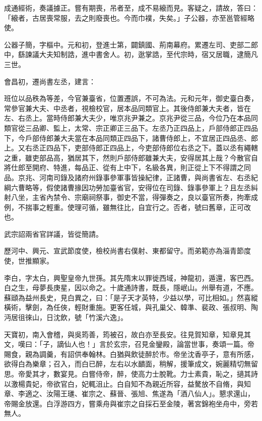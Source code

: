 \begin{pinyinscope}
 成通經術，奏議據正。嘗有期喪，吊者至，成不易縗而見。客疑之，請故，答曰：「縗者，古居喪常服，去之則廢喪也。今而巾襆，失矣。」子公器，亦至邕管經略使。



 公器子簡，字樞中。元和初，登進士第，闢鎮國、荊南幕府。累遷左司、吏部二郎中，繇諫議大夫知制誥，進中書舍人。初，逖掌誥，至代宗時，宿又居職，逮簡凡三世。



 會昌初，遷尚書左丞，建言：



 班位以品秩為等差，今官兼臺省，位置遷誤，不可為法。元和元年，御史臺白奏，常參官兼大夫、中丞者，視檢校官，居本品同類官上。其後侍郎兼大夫者，皆在左、右丞上。當時侍郎兼大夫少，唯京兆尹兼之。京兆尹從三品，今位乃在本品同類官從三品卿、監上，太常、宗正卿正三品下。左丞乃正四品上，戶部侍郎正四品下，今戶部侍郎兼大夫當在本品同類正四品下，諸曹侍郎上，不宜居正四品丞、郎上。又右丞正四品下，吏部侍郎正四品上，今吏部侍郎位右丞之下。蓋以丞有繩轄之重，雖吏部品高，猶居其下，然則戶部侍郎雖兼大夫，安得居其上哉？今散官自將仕郎至開府、特進，每品正、從有上中下，名級各異，則正從上下不得謂之同品。京兆、河南司錄及諸府州錄事參軍事皆操紀律，正諸曹，與尚書省左、右丞紀綱六曹略等，假使諸曹掾因功勞加臺省官，安得位在司錄、錄事參軍上？且左丞糾射八坐，主省內禁令、宗廟祠祭事，御史不當，得彈奏之，良以臺官所奏，拘牽成例，不揣事之輕重。使理可循，雖無往比，自宜行之。否者，號曰舊章，正可改也。



 武宗詔兩省官詳議，皆從簡請。



 歷河中、興元、宣武節度使，檢校尚書右僕射、東都留守。而弟範亦為淄青節度使，世推顯家。



 李白，字太白，興聖皇帝九世孫。其先隋末以罪徙西域，神龍初，遁還，客巴西。白之生，母夢長庚星，因以命之。十歲通詩書，既長，隱岷山。州舉有道，不應。蘇頲為益州長史，見白異之，曰：「是子天才英特，少益以學，可比相如。」然喜縱橫術，擊劍，為任俠，輕財重施。更客任城，與孔巢父、韓準、裴政、張叔明、陶沔居徂徠山，日沈飲，號「竹溪六逸」。



 天寶初，南入會稽，與吳筠善，筠被召，故白亦至長安。往見賀知章，知章見其文，嘆曰：「子，謫仙人也！」言於玄宗，召見金鑾殿，論當世事，奏頌一篇。帝賜食，親為調羹，有詔供奉翰林。白猶與飲徒醉於市。帝坐沈香亭子，意有所感，欲得白為樂章；召入，而白已醉，左右以水靧面，稍解，援筆成文，婉麗精切無留思。帝愛其才，數宴見。白嘗侍帝，醉，使高力士脫靴。力士素貴，恥之，擿其詩以激楊貴妃，帝欲官白，妃輒沮止。白自知不為親近所容，益驁放不自脩，與知章、李適之、汝陽王璡、崔宗之、蘇晉、張旭、焦遂為「酒八仙人」。懇求還山，帝賜金放還。白浮游四方，嘗乘舟與崔宗之自採石至金陵，著宮錦袍坐舟中，旁若無人。




\end{pinyinscope}
